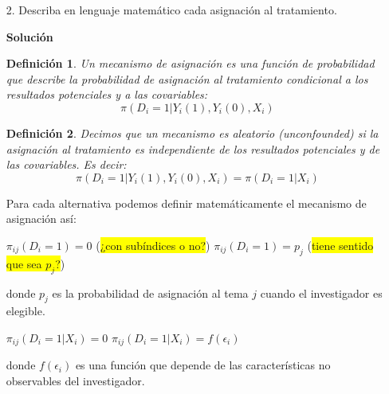 \documentclass[a4paper, answers, addpoints, 11pt]{exam}
\newtheorem{definition}{Definición}
\newenvironment{solucion}{%
  \begin{mdframed}[
    backgroundcolor=blue!5,    %
    linecolor=blue!50,          %
    linewidth=2pt,              %
    leftmargin=10pt,            %
    rightmargin=10pt,           %
    topline=true,              %
    bottomline=true,            %
    roundcorner=10pt,           %
    innerleftmargin=10pt,       %
    innerrightmargin=10pt,      %
    innerbottommargin=10pt,     %
    innertopmargin=10pt         %
  ]%
  \begin{tcolorbox}[colframe=blue!50!black, colback=blue!50, coltitle=white, sharp corners=all, boxrule=1mm, width=\textwidth, halign=left, valign=center, top=0mm, bottom=0mm, left=0mm, right=0mm] \textbf{Solución} \end{tcolorbox} }{\end{mdframed}}
\begin{document}
\bigskip
\begin{itemize}
    \item[2.] Describa en lenguaje matemático cada asignación al tratamiento.
    \begin{solucion}
       \begin{definition}
    Un mecanismo de asignación es una función de probabilidad que describe la probabilidad de asignación al tratamiento condicional a los resultados potenciales y a las covariables:
    $$\pi(D_i = 1 | Y_i(1), Y_i(0), X_i)$$
\end{definition}

\begin{definition}
    Decimos que un mecanismo es aleatorio (\textit{unconfounded}) si la asignación al tratamiento es independiente de los resultados potenciales y de las covariables. Es decir:
    $$\pi(D_i = 1 | Y_i(1), Y_i(0), X_i) = \pi(D_i = 1 | X_i)$$
\end{definition}


Para cada alternativa podemos definir matemáticamente el mecanismo de asignación así:

\begin{algorithm}
\caption{Alternativa 1}
\begin{algorithmic}
            \STATE $\pi_{ij}(D_i = 1) = 0$ (\colorbox{yellow}{¿con subíndices o no?})
        \ELSE
            \STATE $\pi_{ij}(D_i = 1) = p_j$ (\colorbox{yellow}{tiene sentido que sea $p_j$?})
        \ENDIF
    \ENDFOR
\ENDFOR
\end{algorithmic}
\end{algorithm}

donde $p_j$ es la probabilidad de asignación al tema $j$ cuando el investigador es elegible.

\begin{algorithm}
\caption{Alternativa 2}
\begin{algorithmic}
            \STATE $\pi_{ij}(D_i = 1 | X_i) = 0$
        \ELSE
            \STATE $\pi_{ij}(D_i = 1 | X_i) = f(\epsilon_i)$
        \ENDIF
    \ENDFOR
\ENDFOR
\end{algorithmic}
\end{algorithm}

donde $f(\epsilon_i)$ es una función que depende de las características no observables del investigador.


\end{solucion}
\end{itemize}
\end{document}
